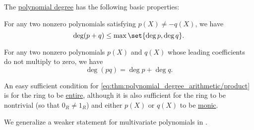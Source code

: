 \begin{proposition}\label{thm:polynomial_degree_arithmetic}
  The \hyperref[def:polynomial_degree]{polynomial degree} has the following basic properties:
  \begin{thmenum}
     For any two nonzero polynomials satisfying \( p(X) \neq -q(X) \), we have
    \begin{equation}\label{eq:thm:polynomial_degree_arithmetic/sum}
      \deg (p + q) \leq \max \set{ \deg p, \deg q }.
    \end{equation}

     For any two nonzero polynomials \( p(X) \) and \( q(X) \) whose leading coefficients do not multiply to zero, we have
    \begin{equation}\label{eq:thm:polynomial_degree_arithmetic/product}
      \deg (pq) = \deg p + \deg q.
    \end{equation}
  \end{thmenum}
\end{proposition}
\begin{comments}
  \item An easy sufficient condition for \eqref{eq:thm:polynomial_degree_arithmetic/product} is for the ring to be \hyperref[def:entire_semiring]{entire}, although it is also sufficient for the ring to be nontrivial (so that \( 0_R \neq 1_R \)) and either \( p(X) \) or \( q(X) \) to be \hyperref[def:monic_polynomial]{monic}.

  \item We generalize a weaker statement for multivariate polynomials in .
\end{comments}
